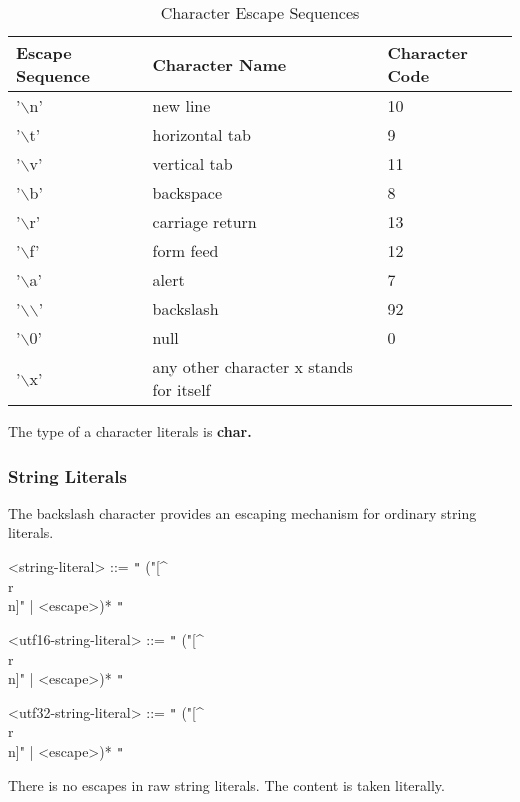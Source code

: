 \documentclass[a4paper,oneside,11pt]{article}
\begin{document}
\begin{table}[htb]
\caption{Character Escape Sequences}\label{tab:charescape}
\begin{tabular}{lll}
\textbf{Escape Sequence }& \textbf{Character Name} & \textbf{Character Code}\\
\hline
'$\backslash$n' & new line& 10\\
'$\backslash$t' & horizontal tab& 9\\
'$\backslash$v' & vertical tab& 11\\
'$\backslash$b' & backspace & 8\\
'$\backslash$r' & carriage return & 13\\
'$\backslash$f' & form feed & 12\\
'$\backslash$a' & alert & 7\\
'$\backslash$$\backslash$' & backslash & 92\\
'$\backslash$0' & null & 0\\
'$\backslash$x' & any other character x stands for itself
\end{tabular}
\end{table}
The type of a character literals is \bf{char}.

\subsubsection{String Literals}

The backslash character provides an escaping mechanism for ordinary string literals.

\begin{grammar}
\label{string-literal}<string-literal> ::= \verb|"| ("[^\"\\r\\n]" | <escape>)* \verb|"|
\end{grammar}
\begin{grammar}
\label{utf16-string-literal}<utf16-string-literal> ::= \verb|"| ("[^\"\\r\\n]" | <escape>)* \verb|"|
\end{grammar}
\begin{grammar}
\label{utf32-string-literal}<utf32-string-literal> ::= \verb|"| ("[^\"\\r\\n]" | <escape>)* \verb|"|
\end{grammar}

There is no escapes in raw string literals. The content is taken literally.
\end{document}
